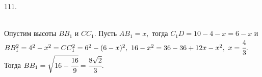 111. \begin{figure}[ht!]
\end{figure}\\
Опустим высоты $BB_1$ и $CC_1.$ Пусть $AB_1=x,$ тогда $C_1D=10-4-x=6-x$ и $BB_1^2=4^2-x^2=CC_1^2=6^2-(6-x)^2,\ 16-x^2=36-36+12x-x^2,\ x=\cfrac{4}{3}.$ Тогда $BB_1=\sqrt{16-\cfrac{16}{9}}=\cfrac{8\sqrt{2}}{3}.$\\
